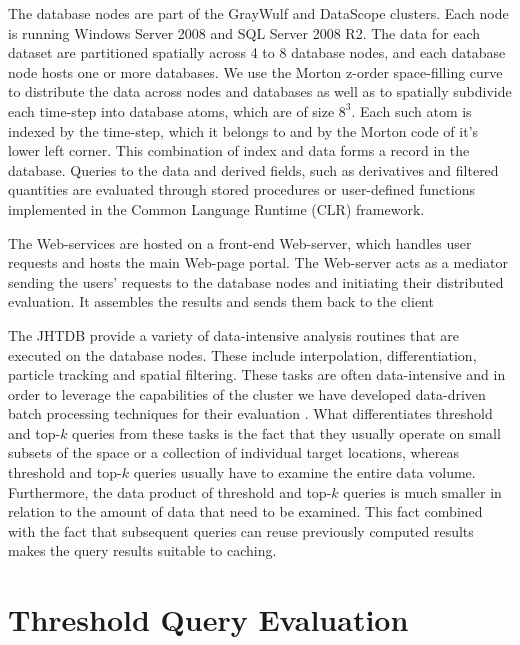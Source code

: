 \documentclass{sig-alternate}
\begin{document}
The database nodes are part of the GrayWulf \cite{Szalay} and DataScope \cite{TODO} clusters. Each node
is running Windows Server 2008 and SQL Server 2008 R2. The data for each dataset are partitioned spatially across 4 to 8
database nodes, and each database node hosts one or more databases. We use the Morton z-order space-filling
curve to distribute the data across nodes and databases as well as to spatially subdivide each time-step
into database atoms, which are of size $8^3$. Each such atom is indexed by the time-step, which it belongs to and
by the Morton code of it's lower left corner. This combination of index and data forms a record in the database.
Queries to the data and derived fields, such as derivatives and filtered quantities are evaluated through
stored procedures or user-defined functions implemented in the Common Language Runtime (CLR) framework.

The Web-services are hosted on a front-end Web-server, which handles user requests and hosts the main Web-page portal.
The Web-server acts as a mediator sending the users' requests to the database nodes and initiating their distributed evaluation. 
It assembles the results and sends them back to the client

The JHTDB provide a variety of data-intensive analysis routines that are executed on the database nodes. These include interpolation, 
differentiation, particle tracking and spatial filtering. These tasks are often data-intensive and in order to leverage the capabilities of the cluster we
have developed data-driven batch processing techniques for their evaluation \cite{KanovSC11, KanovSC12}. What differentiates threshold and
top-$k$ queries from these tasks is the fact that they usually operate on small subsets of the space or a collection of individual target locations, whereas
threshold and top-$k$ queries usually have to examine the entire data volume. Furthermore, the data product of threshold and top-$k$ queries is much
smaller in relation to the amount of data that need to be examined. This fact combined with the fact that subsequent queries can reuse previously
computed results makes the query results suitable to caching. 

\section{Threshold Query Evaluation}
\end{document}
